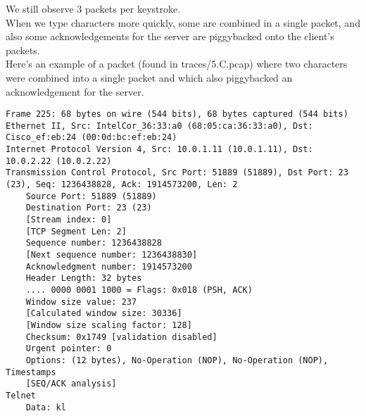 We still observe 3 packets per keystroke. \\
When we type characters more quickly, some are combined in a single packet,
and also some acknowledgements for the server are piggybacked onto the client's packets. \\
Here's an example of a packet (found in traces/5.C.pcap) where two characters were combined
into a single packet and which also piggybacked an acknowledgement for the server.

\begin{lstlisting}
Frame 225: 68 bytes on wire (544 bits), 68 bytes captured (544 bits)
Ethernet II, Src: IntelCor_36:33:a0 (68:05:ca:36:33:a0), Dst: Cisco_ef:eb:24 (00:0d:bc:ef:eb:24)
Internet Protocol Version 4, Src: 10.0.1.11 (10.0.1.11), Dst: 10.0.2.22 (10.0.2.22)
Transmission Control Protocol, Src Port: 51889 (51889), Dst Port: 23 (23), Seq: 1236438828, Ack: 1914573200, Len: 2
    Source Port: 51889 (51889)
    Destination Port: 23 (23)
    [Stream index: 0]
    [TCP Segment Len: 2]
    Sequence number: 1236438828
    [Next sequence number: 1236438830]
    Acknowledgment number: 1914573200
    Header Length: 32 bytes
    .... 0000 0001 1000 = Flags: 0x018 (PSH, ACK)
    Window size value: 237
    [Calculated window size: 30336]
    [Window size scaling factor: 128]
    Checksum: 0x1749 [validation disabled]
    Urgent pointer: 0
    Options: (12 bytes), No-Operation (NOP), No-Operation (NOP), Timestamps
    [SEQ/ACK analysis]
Telnet
    Data: kl
\end{lstlisting}
